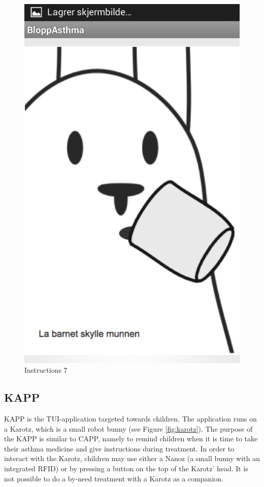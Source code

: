 \begin{figure}[H]
	\begin{minipage}[b]{0.3\linewidth}
		\centering
		\includegraphics[width=0.20\paperwidth]{Pictures/app-screenshots/instructions-7.png}
		\caption{Instructions 7}
		\label{fig:instructions-7}
	\end{minipage}
\end{figure}


\subsection{KAPP}
\label{sec:description-kapp}
KAPP is the TUI-application targeted towards children. The application runs on a Karotz\cite{karotz}, which is a small robot bunny (see Figure \ref{fig:karotz}). The purpose of the KAPP is similar to CAPP, namely to remind children when it is time to take their asthma medicine and give instructions during treatment. In order to interact with the Karotz, children may use either a Nanoz (a small bunny with an integrated RFID) or by pressing a button on the top of the Karotz' head. It is not possible to do a by-need treatment with a Karotz as a companion. 

